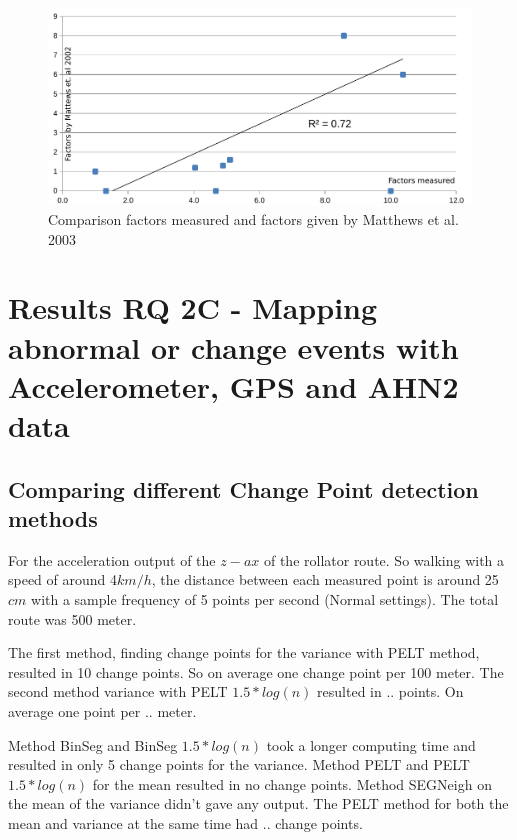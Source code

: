 \begin{figure}[ht]
\includegraphics[width=\textwidth]{img/R_factors_compared.pdf}
\centering
\caption[Comparison factors measured and factors given]{
Comparison factors measured and factors given by Matthews et al. 2003\label{comparefig}}
\end{figure} 

\clearpage



\section{Results RQ 2C - Mapping abnormal or change events with Accelerometer, GPS and AHN2 data}

\subsection{Comparing different Change Point detection methods}

For the acceleration output of the $z-ax$ of the rollator route. So walking with a speed of around 4$km/h$, the distance between each measured point is  around 25$cm$ with a sample frequency of 5 points per second (Normal settings). The total route was 500 meter. 

The first method, finding change points for the variance with PELT method, resulted in 10 change points. So on average one change point per 100 meter.  The second method variance with PELT $1.5*log(n)$ resulted in .. points. On average one point per .. meter. 

Method BinSeg and BinSeg $1.5*log(n)$ took a longer computing time and resulted in only 5 change points for the variance. Method PELT and PELT $1.5*log(n)$  for the mean resulted in no change points. Method SEGNeigh on the mean of the variance didn't gave any output. The PELT method for both the mean and variance at the same time had .. change points. 



